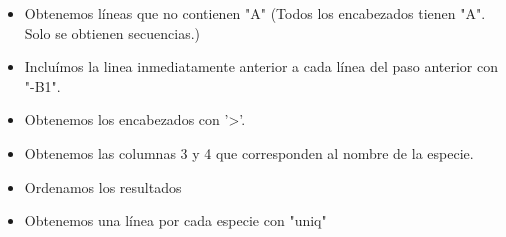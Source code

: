\documentclass[10pt]{article}
\begin{document}
\begin{itemize}
  \item Obtenemos líneas que no contienen "A" (Todos los encabezados tienen "A". Solo se obtienen secuencias.)
  \item Incluímos la linea inmediatamente anterior a cada línea del paso anterior con "-B1".
  \item Obtenemos los encabezados con '>'.
  \item Obtenemos las columnas 3 y 4 que corresponden al nombre de la especie.
  \item Ordenamos los resultados
  \item Obtenemos una línea por cada especie con "uniq"
\end{itemize}
\end{document}
